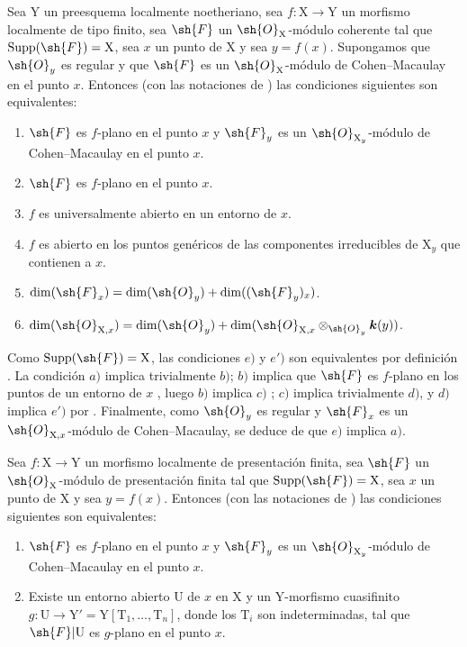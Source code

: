 \begin{proposition}[15.4.2]
\label{IV.15.4.2}
Sea $\mathrm{Y}$ un preesquema localmente noetheriano, sea $f:\mathrm{X}\to\mathrm{Y}$ un morfismo localmente de tipo finito, sea $\sh{F}$ un $\sh{O}_\mathrm{X}$-módulo coherente tal que $\operatorname{Supp}(\sh{F})=\mathrm{X}$, sea $x$ un punto de $\mathrm{X}$ y sea $y=f(x)$.
Supongamos que $\sh{O}_y$ es regular y que $\sh{F}$ es un $\sh{O}_\mathrm{X}$-módulo de Cohen--Macaulay en el punto $x$.
Entonces \textup{(con las notaciones de )} las condiciones siguientes son equivalentes:
\begin{enumerate}[label=\emph{\alph*})]
  \item $\sh{F}$ es $f$-plano en el punto $x$ y $\sh{F}_y$ es un $\sh{O}_{\mathrm{X}_y}$-módulo de Cohen--Macaulay en el punto $x$.
  \item $\sh{F}$ es $f$-plano en el punto $x$.
  \item $f$ es universalmente abierto en un entorno de $x$.
  \item $f$ es abierto en los puntos genéricos de las componentes irreducibles de $\mathrm{X}_y$ que contienen a $x$.
  \item $\dim(\sh{F}_x)=\dim(\sh{O}_y)+\dim((\sh{F}_y)_x)$.
  \item[\emph{e}$'$)] $\dim(\sh{O}_{\mathrm{X},x})=\dim(\sh{O}_y)+\dim(\sh{O}_{\mathrm{X},x}\otimes_{\sh{O}_y}\boldsymbol{k}(y))$.
\end{enumerate}
Como $\operatorname{Supp}(\sh{F})=\mathrm{X}$, las condiciones $e)$ y $e')$ son equivalentes por definición .
La condición $a)$ implica trivialmente $b)$; $b)$ implica que $\sh{F}$ es $f$-plano en los puntos de un entorno de $x$ , luego $b)$ implica $c)$ ; $c)$ implica trivialmente $d)$, y $d)$ implica $e')$ por .
Finalmente, como $\sh{O}_y$ es regular y $\sh{F}_x$ es un $\sh{O}_{\mathrm{X},x}$-módulo de Cohen--Macaulay, se deduce de  que $e)$ implica $a)$.
\end{proposition}

\begin{proposition}[15.4.3]
\label{IV.15.4.3}
Sea $f:\mathrm{X}\to\mathrm{Y}$ un morfismo localmente de presentación finita, sea $\sh{F}$ un $\sh{O}_\mathrm{X}$-módulo de presentación finita tal que $\operatorname{Supp}(\sh{F})=\mathrm{X}$, sea $x$ un punto de $\mathrm{X}$ y sea $y=f(x)$.
Entonces \textup{(con las notaciones de )} las condiciones siguientes son equivalentes:
\begin{enumerate}[label=\emph{\alph*})]
  \item $\sh{F}$ es $f$-plano en el punto $x$ y $\sh{F}_y$ es un $\sh{O}_{\mathrm{X}_y}$-módulo de Cohen--Macaulay en el punto $x$.
  \item Existe un entorno abierto $\mathrm{U}$ de $x$ en $\mathrm{X}$ y un $\mathrm{Y}$-morfismo cuasifinito $g:\mathrm{U}\to\mathrm{Y}'=\mathrm{Y}[\mathrm{T}_1,\ldots,\mathrm{T}_n]$, donde los $\mathrm{T}_i$ son indeterminadas, tal que $\sh{F}|\mathrm{U}$ es $g$-plano en el punto $x$.
\end{enumerate}
\end{proposition}

